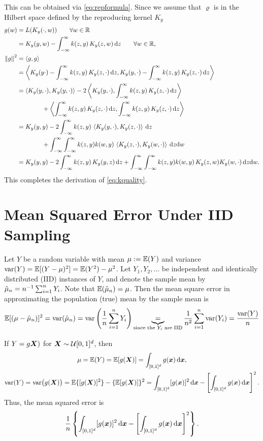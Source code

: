 \documentclass[letterpaper]{amsart}
\newcommand{\KY}{K_y}
\begin{document}
This can be obtained via \eqref{eq:repformula}.  Since we assume that $\varrho$ is in the Hilbert space defined by the reproducing kernel $\KY$
\begin{align*}
    g(w) &= L(\KY(\cdot,w)) \qquad \forall w \in \reals \\
    & = \KY(y,w) - \int_{-\infty}^{\infty} k(z,y) \, \KY(z,w) \, \dif z \qquad \forall w \in \reals, \\
    \norm{g}^2 &= \ip{g}{g} \\
    & = \ip{\KY(y\cdot) - \int_{-\infty}^{\infty} k(z,y) \, \KY(z,\cdot) \, \dif z}{\KY(y,\cdot) - \int_{-\infty}^{\infty} k(z,y) \, \KY(z,\cdot) \, \dif z} \\
    & = \ip{\KY(y,\cdot)}{\KY(y,\cdot)} 
      - 2 \ip{\KY(y,\cdot)}{\int_{-\infty}^{\infty} k(z,y) \, \KY(z,\cdot) \, \dif z} \\
     & \qquad \qquad   + \ip{\int_{-\infty}^{\infty} k(z,y) \, \KY(z,\cdot) \, \dif z}{\int_{-\infty}^{\infty} k(z,y) \, \KY(z,\cdot) \, \dif z} \\
    & = \KY(y,y)
      - 2 \int_{-\infty}^{\infty} k(z,y) \, \ip{\KY(y,\cdot)}{\KY(z,\cdot)} \, \dif z \\
    & \qquad \qquad   + \int_{-\infty}^{\infty} \int_{-\infty}^{\infty} k(z,y) k(w,y) \, \ip{ \KY(z,\cdot)}{\KY(w,\cdot)} \,  \dif z\dif w \\
   & = \KY(y,y)
      - 2 \int_{-\infty}^{\infty} k(z,y) \, \KY(y,z) \, \dif z
     + \int_{-\infty}^{\infty} \int_{-\infty}^{\infty} k(z,y) k(w,y) \, \KY(z,w)\KY(w,\cdot) \,  \dif z\dif w.
\end{align*}
This completes the derivation of \eqref{eq:kquality}.

\section{Mean Squared Error Under IID Sampling} \label{app:MSE}
Let $Y$ be a random variable with mean $\mu :=  \operatorname{\mathbb{E}}(Y)$ and variance $\operatorname{var}(Y) = \operatorname{\mathbb{E}}[(Y - \mu)^2] = \operatorname{\mathbb{E}}(Y^2) - \mu^2$.  Let $Y_1, Y_2, \ldots$ be independent and identically distributed (IID) instances of $Y$, and denote the sample mean by $\hat{\mu}_n = n^{-1} \sum_{i=1}^n Y_i$.  Note that $\operatorname{\mathbb{E}}(\hat{\mu}_n) = \mu$.  Then the mean square error in approximating the population (true) mean by the sample mean is 
\begin{equation*}
    \operatorname{\mathbb{E}}[(\mu - \hat{\mu}_n)]^2  =  \operatorname{var}(\hat{\mu}_n) = \operatorname{var} \left (\frac{1}{n} \sum_{i=1}^n Y_i \right) \underbrace{=}_{\text{since the $Y_i$ are IID}} \frac 1{n^2} \sum_{i=1}^n \operatorname{var}(Y_i) = \frac{\operatorname{var}(Y)}{n}
\end{equation*}

If $Y = g\boldsymbol{X})$ for $\boldsymbol{X} \sim \mathcal{U}[0,1]^d$, then 
\begin{gather*}
    \mu = \operatorname{\mathbb{E}}(Y) = \operatorname{\mathbb{E}}[g(\boldsymbol{X})]  = \int_{[0,1]^d} g(\boldsymbol{x}) \, {\rm d} \boldsymbol{x}, \\ 
    \operatorname{var}(Y) = \operatorname{var}\bigl(g(\boldsymbol{X})\bigr) = \operatorname{\mathbb{E}}\{[g(\boldsymbol{X})]^2\} - \{\operatorname{\mathbb{E}}[g(\boldsymbol{X})]\}^2 = \int_{[0,1]^d} [g(\boldsymbol{x})]^2  \, {\rm d} \boldsymbol{x} - 
    \left[\int_{[0,1]^d} g(\boldsymbol{x}) \, {\rm d} \boldsymbol{x}\right]^2.
\end{gather*}
Thus, the mean squared error is 
\[
\frac 1n  \left\{\int_{[0,1]^d} [g(\boldsymbol{x})]^2  \, {\rm d} \boldsymbol{x} - 
    \left[\int_{[0,1]^d} g(\boldsymbol{x}) \, {\rm d} \boldsymbol{x}\right]^2 \right\}.
\]
\end{document}
